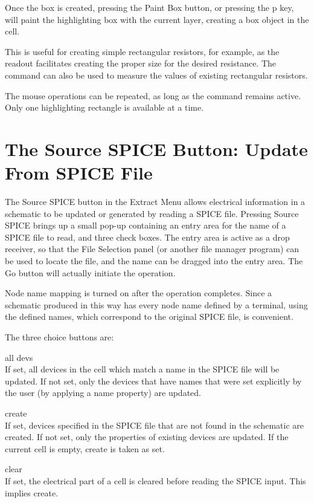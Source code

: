 Once the box is created, pressing the {\cb Paint Box} button, or
pressing the {\kb p} key, will paint the highlighting box with the
current layer, creating a box object in the cell.

This is useful for creating simple rectangular resistors, for example,
as the readout facilitates creating the proper size for the desired
resistance.  The command can also be used to measure the values of
existing rectangular resistors.

The mouse operations can be repeated, as long as the command remains
active.  Only one highlighting rectangle is available at a time.


\section{The {\cb Source SPICE} Button: Update From SPICE File}
The {\cb Source SPICE} button in the {\cb Extract Menu} allows
electrical information in a schematic to be updated or generated by
reading a SPICE file.  Pressing {\cb Source SPICE} brings up a small
pop-up containing an entry area for the name of a SPICE file to read,
and three check boxes.  The entry area is active as a drop receiver,
so that the {\cb File Selection} panel (or another file manager
program) can be used to locate the file, and the name can be dragged
into the entry area.  The {\cb Go} button will actually initiate the
operation.

Node name mapping is turned on after the operation completes.  Since a
schematic produced in this way has every node name defined by a
terminal, using the defined names, which correspond to the original
SPICE file, is convenient.

The three choice buttons are:
\begin{description}
\item{\cb all devs}\\
If set, all devices in the cell which match a name in the SPICE file
will be updated.  If not set, only the devices that have names that
were set explicitly by the user (by applying a name property) are
updated.
\item{\cb create}\\
If set, devices specified in the SPICE file that are not found in the
schematic are created.  If not set, only the properties of existing
devices are updated.  If the current cell is empty, {\cb create} is
taken as set.
\item{\cb clear}\\
If set, the electrical part of a cell is cleared before reading the
SPICE input.  This implies {\cb create}.
\end{description}

